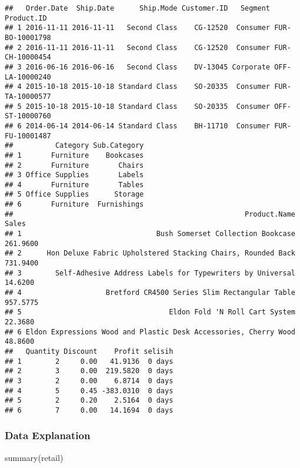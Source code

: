\documentclass[
]{article}
\newenvironment{Shaded}{\begin{snugshade}}{\end{snugshade}}
\newcommand{\FunctionTok}[1]{\textcolor[rgb]{0.00,0.00,0.00}{#1}}
\newcommand{\NormalTok}[1]{#1}
\newcommand{\OtherTok}[1]{\textcolor[rgb]{0.56,0.35,0.01}{#1}}
\newcommand{\SpecialCharTok}[1]{\textcolor[rgb]{0.00,0.00,0.00}{#1}}
\begin{document}
\begin{verbatim}
##   Order.Date  Ship.Date      Ship.Mode Customer.ID   Segment      Product.ID
## 1 2016-11-11 2016-11-11   Second Class    CG-12520  Consumer FUR-BO-10001798
## 2 2016-11-11 2016-11-11   Second Class    CG-12520  Consumer FUR-CH-10000454
## 3 2016-06-16 2016-06-16   Second Class    DV-13045 Corporate OFF-LA-10000240
## 4 2015-10-18 2015-10-18 Standard Class    SO-20335  Consumer FUR-TA-10000577
## 5 2015-10-18 2015-10-18 Standard Class    SO-20335  Consumer OFF-ST-10000760
## 6 2014-06-14 2014-06-14 Standard Class    BH-11710  Consumer FUR-FU-10001487
##          Category Sub.Category
## 1       Furniture    Bookcases
## 2       Furniture       Chairs
## 3 Office Supplies       Labels
## 4       Furniture       Tables
## 5 Office Supplies      Storage
## 6       Furniture  Furnishings
##                                                       Product.Name    Sales
## 1                                Bush Somerset Collection Bookcase 261.9600
## 2      Hon Deluxe Fabric Upholstered Stacking Chairs, Rounded Back 731.9400
## 3        Self-Adhesive Address Labels for Typewriters by Universal  14.6200
## 4                    Bretford CR4500 Series Slim Rectangular Table 957.5775
## 5                                   Eldon Fold 'N Roll Cart System  22.3680
## 6 Eldon Expressions Wood and Plastic Desk Accessories, Cherry Wood  48.8600
##   Quantity Discount    Profit selisih
## 1        2     0.00   41.9136  0 days
## 2        3     0.00  219.5820  0 days
## 3        2     0.00    6.8714  0 days
## 4        5     0.45 -383.0310  0 days
## 5        2     0.20    2.5164  0 days
## 6        7     0.00   14.1694  0 days
\end{verbatim}

\begin{Shaded}
\end{Shaded}

\hypertarget{data-explanation}{%
\subsubsection{Data Explanation}\label{data-explanation}}

\begin{Shaded}
\begin{Highlighting}[]
\FunctionTok{summary}\NormalTok{(retail)}
\end{Highlighting}
\end{Shaded}
\end{document}
